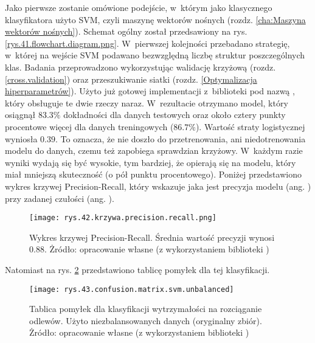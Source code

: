 Jako pierwsze zostanie omówione podejście, w~którym jako klasycznego klasyfikatora użyto SVM, czyli maszynę wektorów nośnych (rozdz. \ref{cha:Maszyna wektorów nośnych}). Schemat ogólny został przedsawiony na rys. \ref{rys.41.flowchart.diagram.png}. W~pierwszej kolejności przebadano strategię, w~której na wejście SVM podawano bezwzględną liczbę struktur poszczególnych klas. Badania przeprowadzono wykorzystując walidację krzyżową (rozdz. \ref{cross.validation}) oraz przeszukiwanie siatki (rozdz. \ref{Optymalizacja hiperparametrów}). Użyto już gotowej implementacji z~biblioteki  pod nazwą , który obsługuje te dwie rzeczy naraz. W~rezultacie otrzymano model, który osiągnął $83.3\%$ dokładności dla danych testowych oraz około cztery punkty procentowe więcej dla danych treningowych ($86.7\%$). Wartość straty logistycznej wyniosła $0.39$. To oznacza, że nie doszło do przetrenowania, ani niedotrenowania modelu do danych, czemu też zapobiega sprawdzian krzyżowy. W~każdym razie wyniki wydają się być wysokie, tym bardziej, że opierają się na modelu, który miał mniejszą skuteczność (o pół punktu procentowego). Poniżej przedstawiono wykres krzywej Precision-Recall, który wskazuje jaka jest precyzja modelu (ang. ) przy zadanej czułości (ang. ). 
\begin{figure}[h]
    \centering
    \texttt{[image: rys.42.krzywa.precision.recall.png]}
    \caption{Wykres krzywej Precision-Recall. Średnia wartość precyzji wynosi 0.88. Żródło: opracowanie własne (z wykorzystaniem biblioteki )}
    \label{rys.42.krzywa.precision.recall.png}
\end{figure}
Natomiast na rys. \ref{rys.43.confusion.matrix.svm.unbalanced} przedstawiono tablicę pomyłek dla tej klasyfikacji.
\begin{figure}[h]
    \centering
    \texttt{[image: rys.43.confusion.matrix.svm.unbalanced]}
    \caption{Tablica pomyłek dla klasyfikacji wytrzymałości na rozciąganie odlewów. Użyto niezbalansowanych danych (oryginalny zbiór). Żródło: opracowanie własne (z wykorzystaniem biblioteki )}
    \label{rys.43.confusion.matrix.svm.unbalanced}
\end{figure}

